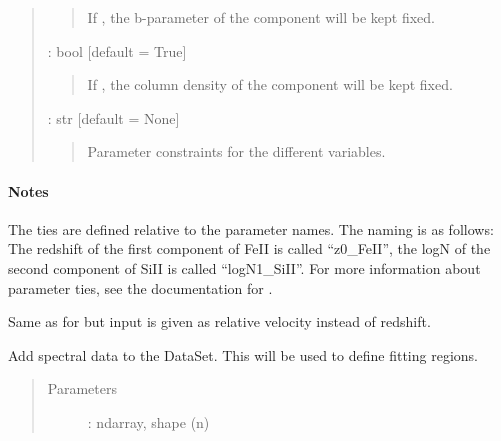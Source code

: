 \documentclass[letterpaper,10pt,english]{sphinxmanual}
\begin{document}
\begin{fulllineitems}
\begin{fulllineitems}
\begin{quote}
\begin{description}
\begin{quote}
If , the b-parameter of the component will be kept fixed.
\end{quote}

 : bool   {[}default = True{]}
\begin{quote}

If , the column density of the component will be kept fixed.
\end{quote}

 : str   {[}default = None{]}
\begin{quote}

Parameter constraints for the different variables.
\end{quote}

\end{description}\end{quote}
\paragraph{Notes}

The ties are defined relative to the parameter names. The naming is as follows:
The redshift of the first component of FeII is called “z0\_FeII”,
the logN of the second component of SiII is called “logN1\_SiII”.
For more information about parameter ties, see the documentation for .

\end{fulllineitems}


\begin{fulllineitems}
\label{\detokenize{api:VoigtFit.DataSet.add_component_velocity}}
Same as for {\hyperref[\detokenize{api:VoigtFit.DataSet.add_component}]{}}
but input is given as relative velocity instead of redshift.

\end{fulllineitems}


\begin{fulllineitems}
\label{\detokenize{api:VoigtFit.DataSet.add_data}}
Add spectral data to the DataSet. This will be used to define fitting regions.
\begin{quote}\begin{description}
\item[{Parameters}] \leavevmode
{} : ndarray, shape (n)
\begin{quote}


\end{quote}
\end{description}
\end{quote}
\end{fulllineitems}
\end{fulllineitems}
\end{document}
